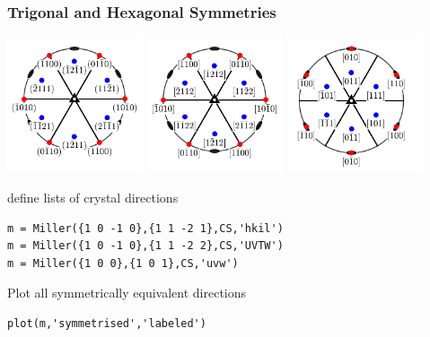 \documentclass[compress]{beamer}
\begin{document}
\begin{frame}[fragile]
  \frametitle{Trigonal and Hexagonal Symmetries}

  \vspace{-.3cm}

  \begin{center}
    \includegraphics[width=4cm]{pic/hkl}
    \includegraphics[width=4cm]{pic/uvtw}
    \includegraphics[width=4cm]{pic/uvw}
  \end{center}

  \vspace{-.5cm}

  define lists of crystal directions
  \vspace{-.2cm}
  \begin{lstlisting}[style=input]
m = Miller({1 0 -1 0},{1 1 -2 1},CS,'hkil')
m = Miller({1 0 -1 0},{1 1 -2 2},CS,'UVTW')
m = Miller({1 0 0},{1 0 1},CS,'uvw')
  \end{lstlisting}%

  \medskip

  Plot all symmetrically equivalent directions
    \vspace{-.2cm}
  \begin{lstlisting}[style=input]
plot(m,'symmetrised','labeled')
  \end{lstlisting}



\end{frame}
\end{document}
